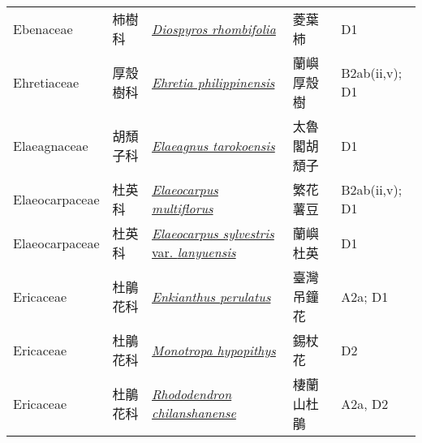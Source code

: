 {\begin{longtable}{L{2.5cm}L{2cm}L{5cm}L{2.5cm}L{3cm}}
    Ebenaceae & 柿樹科 & \href{http://www.theplantlist.org/tpl1.1/search?q=Diospyros+rhombifolia}{\textit{Diospyros rhombifolia} } & 菱葉柿 & D1    \\
    Ehretiaceae & 厚殼樹科 & \href{http://www.theplantlist.org/tpl1.1/search?q=Ehretia+philippinensis}{\textit{Ehretia philippinensis} } & 蘭嶼厚殼樹 & B2ab(ii,v); D1    \\
    Elaeagnaceae & 胡頹子科 & \href{http://www.theplantlist.org/tpl1.1/search?q=Elaeagnus+tarokoensis}{\textit{Elaeagnus tarokoensis} } & 太魯閣胡頹子 & D1    \\
    Elaeocarpaceae & 杜英科 & \href{http://www.theplantlist.org/tpl1.1/search?q=Elaeocarpus+multiflorus}{\textit{Elaeocarpus multiflorus} } & 繁花薯豆 & B2ab(ii,v); D1    \\
    Elaeocarpaceae & 杜英科 & \href{http://www.theplantlist.org/tpl1.1/search?q=Elaeocarpus+sylvestris+var.+lanyuensis}{\textit{Elaeocarpus sylvestris} var. \textit{lanyuensis} } & 蘭嶼杜英 & D1    \\
    Ericaceae & 杜鵑花科 & \href{http://www.theplantlist.org/tpl1.1/search?q=Enkianthus+perulatus}{\textit{Enkianthus perulatus} } & 臺灣吊鐘花 & A2a; D1    \\
    Ericaceae & 杜鵑花科 & \href{http://www.theplantlist.org/tpl1.1/search?q=Monotropa+hypopithys}{\textit{Monotropa hypopithys} } & 錫杖花 & D2    \\
    Ericaceae & 杜鵑花科 & \href{http://www.theplantlist.org/tpl1.1/search?q=Rhododendron+chilanshanense}{\textit{Rhododendron chilanshanense} } & 棲蘭山杜鵑 & A2a, D2    \\

\end{longtable}}
